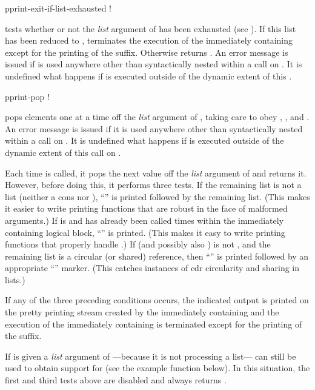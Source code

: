 \begin{defmac}
pprint-exit-if-list-exhausted \!!

 tests whether or not the \emph{list}
argument of  has been exhausted (see
).  If this list has been reduced to ,
 terminates the execution of the
immediately containing  except for the printing of
the suffix.  Otherwise  returns .
An error message is issued if  is used
anywhere other than syntactically nested within a call on
.  It is undefined what happens if 
is executed outside of the dynamic extent of this
.
\end{defmac}

\begin{defmac}
pprint-pop \!!

 pops elements one at a time off the \emph{list} argument of
, taking care to obey ,
, and .  An error message is issued if it is
used anywhere other than syntactically nested within a call on
. It is undefined what happens if  is executed
outside of the dynamic extent of this call on .

Each time  is called, it pops the next value off the \emph{list}
argument of  and returns it.  However, 
before doing this, it performs three tests.  If the remaining list is not a
list (neither a cons nor ), ``'' is printed
followed by the remaining list.  (This makes it easier to write printing
functions that are robust in the face of malformed arguments.)  If
 is  and  has already been called
 times within the immediately containing logical block,
``'' is printed.  (This makes it easy to write printing functions
that properly handle .)  If  (and possibly also
) is not , and the remaining list is a circular
(or shared) reference, then ``'' is printed followed by an appropriate
``'' marker.  (This catches instances of cdr circularity and sharing
in lists.)

If any of the three preceding conditions occurs, the indicated output is
printed on the pretty printing stream created by the immediately containing
and the execution of the immediately containing
is terminated except for the printing of the suffix.

If  is given a \emph{list} argument of
---because it is not processing a list--- can still
be used to obtain support for  (see the example function
 below).  In this situation, the first and third tests
above are disabled and  always returns .
\end{defmac}

